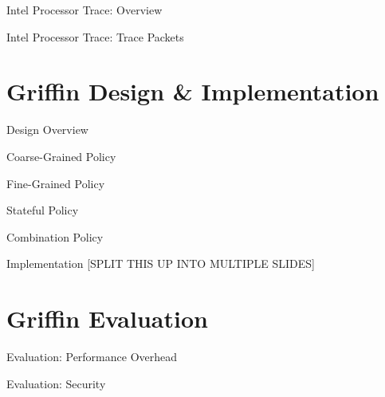 \documentclass[12pt, dvipsnames, aspectratio=169]{beamer}
\newcommand{\todo}[1]{{\color{orange}[#1]}}
\begin{document}
\begin{frame}[c]{Intel Processor Trace: Overview}{}

\end{frame}

\begin{frame}[c]{Intel Processor Trace: Trace Packets}{}

\end{frame}

\section{Griffin Design \& Implementation}

\begin{frame}[c]{Design Overview}{}

\end{frame}

\begin{frame}[c]{Coarse-Grained Policy}{}

\end{frame}

\begin{frame}[c]{Fine-Grained Policy}{}

\end{frame}

\begin{frame}[c]{Stateful Policy}{}

\end{frame}

\begin{frame}[c]{Combination Policy}{}

\end{frame}

\begin{frame}[c]{Implementation}{}
  \todo{SPLIT THIS UP INTO MULTIPLE SLIDES}
\end{frame}

\section{Griffin Evaluation}

\begin{frame}[c]{Evaluation: Performance Overhead}{}

\end{frame}

\begin{frame}[c]{Evaluation: Security}{}

\end{frame}
\end{document}
